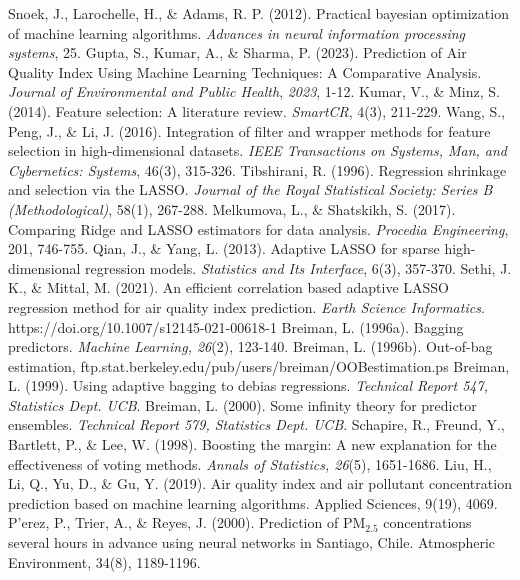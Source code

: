 \documentclass{book}
\numberwithin{equation}{section}
\numberwithin{figure}{section}
\begin{document}
\begin{thebibliography}{99}
    Snoek, J., Larochelle, H., \& Adams, R. P. (2012). Practical bayesian optimization of machine learning algorithms. \textit{Advances in neural information processing systems}, 25.
    Gupta, S., Kumar, A., \& Sharma, P. (2023). Prediction of Air Quality Index Using Machine Learning Techniques: A Comparative Analysis. \textit{Journal of Environmental and Public Health}, \textit{2023}, 1-12. 
    Kumar, V., \& Minz, S. (2014). Feature selection: A literature review. \textit{SmartCR}, 4(3), 211-229.
    Wang, S., Peng, J., \& Li, J. (2016). Integration of filter and wrapper methods for feature selection in high-dimensional datasets. \textit{IEEE Transactions on Systems, Man, and Cybernetics: Systems}, 46(3), 315-326.
    Tibshirani, R. (1996). Regression shrinkage and selection via the LASSO. \textit{Journal of the Royal Statistical Society: Series B (Methodological)}, 58(1), 267-288.
    Melkumova, L., \& Shatskikh, S. (2017). Comparing Ridge and LASSO estimators for data analysis. \textit{Procedia Engineering}, 201, 746-755.
    Qian, J., \& Yang, L. (2013). Adaptive LASSO for sparse high-dimensional regression models. \textit{Statistics and Its Interface}, 6(3), 357-370.
    Sethi, J. K., \& Mittal, M. (2021). An efficient correlation based adaptive LASSO regression method for air quality index prediction. \textit{Earth Science Informatics}. https://doi.org/10.1007/s12145-021-00618-1
    Breiman, L. (1996a). Bagging predictors. \textit{Machine Learning, 26}(2), 123-140.
    Breiman, L. (1996b). Out-of-bag estimation, ftp.stat.berkeley.edu/pub/users/breiman/OOBestimation.ps
    Breiman, L. (1999). Using adaptive bagging to debias regressions. \textit{Technical Report 547, Statistics Dept. UCB}.
    Breiman, L. (2000). Some infinity theory for predictor ensembles. \textit{Technical Report 579, Statistics Dept. UCB}.
    Schapire, R., Freund, Y., Bartlett, P., \& Lee, W. (1998). Boosting the margin: A new explanation for the effectiveness of voting methods. \textit{Annals of Statistics, 26}(5), 1651-1686.
    Liu, H., Li, Q., Yu, D., \& Gu, Y. (2019). Air quality index and air pollutant concentration prediction based on machine learning algorithms. Applied Sciences, 9(19), 4069.
    P'erez, P., Trier, A., \& Reyes, J. (2000). Prediction of PM$_{2.5}$ concentrations several hours in advance using neural networks in Santiago, Chile. Atmospheric Environment, 34(8), 1189-1196.

\end{thebibliography}
\end{document}
